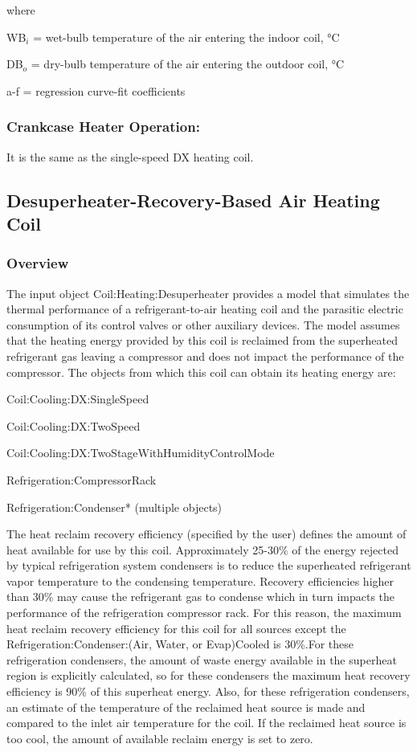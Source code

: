 where

WB\(_{i}\) = wet-bulb temperature of the air entering the indoor coil, °C

DB\(_{o}\) = dry-bulb temperature of the air entering the outdoor coil, °C

a-f = regression curve-fit coefficients

\subsubsection{Crankcase Heater Operation:}\label{crankcase-heater-operation}

It is the same as the single-speed DX heating coil.

\subsection{Desuperheater-Recovery-Based Air Heating Coil}\label{desuperheater-recovery-based-air-heating-coil}

\subsubsection{Overview}\label{overview-9}

The input object Coil:Heating:Desuperheater provides a model that simulates the thermal performance of a refrigerant-to-air heating coil and the parasitic electric consumption of its control valves or other auxiliary devices. The model assumes that the heating energy provided by this coil is reclaimed from the superheated refrigerant gas leaving a compressor and does not impact the performance of the compressor. The objects from which this coil can obtain its heating energy are:

Coil:Cooling:DX:SingleSpeed

Coil:Cooling:DX:TwoSpeed

Coil:Cooling:DX:TwoStageWithHumidityControlMode

Refrigeration:CompressorRack

Refrigeration:Condenser* (multiple objects)

The heat reclaim recovery efficiency (specified by the user) defines the amount of heat available for use by this coil. Approximately 25-30\% of the energy rejected by typical refrigeration system condensers is to reduce the superheated refrigerant vapor temperature to the condensing temperature. Recovery efficiencies higher than 30\% may cause the refrigerant gas to condense which in turn impacts the performance of the refrigeration compressor rack. For this reason, the maximum heat reclaim recovery efficiency for this coil for all sources except the Refrigeration:Condenser:(Air, Water, or Evap)Cooled is 30\%.For these refrigeration condensers, the amount of waste energy available in the superheat region is explicitly calculated, so for these condensers the maximum heat recovery efficiency is 90\% of this superheat energy. Also, for these refrigeration condensers, an estimate of the temperature of the reclaimed heat source is made and compared to the inlet air temperature for the coil. If the reclaimed heat source is too cool, the amount of available reclaim energy is set to zero.

